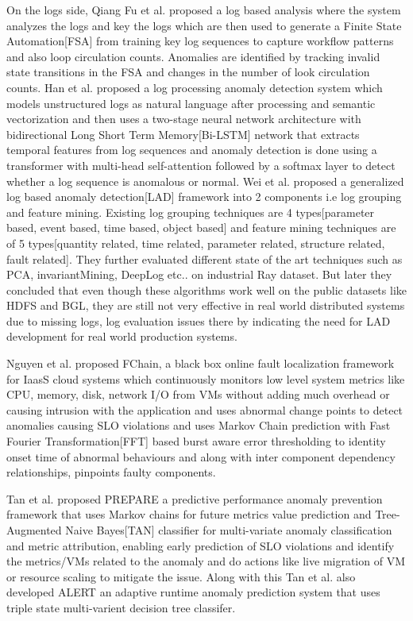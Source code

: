 \documentclass[sigconf]{acmart}
\begin{document}
On the logs side, Qiang Fu et al. proposed a log based analysis where the system analyzes the logs and key the logs which are then used to generate a Finite State Automation[FSA] from training key log sequences to capture workflow patterns and also loop circulation counts. Anomalies are identified by tracking invalid state transitions in the FSA and changes in the number of look circulation counts.\cite{5360240} Han et al. proposed a log processing anomaly detection system which models unstructured logs as natural language after processing and semantic vectorization and then uses a two-stage neural network architecture with bidirectional Long Short Term Memory[Bi-LSTM] network that extracts temporal features from log sequences and anomaly detection is done using a transformer with multi-head self-attention followed by a softmax layer to detect whether a log sequence is anomalous or normal.\cite{https://doi.org/10.1111/coin.12573} Wei et al. proposed a generalized log based anomaly detection[LAD] framework into 2 components i.e log grouping and feature mining. Existing log grouping techniques are 4 types[parameter based, event based, time based, object based] and feature mining techniques are of 5 types[quantity related, time related, parameter related, structure related, fault related]. They further evaluated different state of the art techniques such as PCA, invariantMining, DeepLog etc.. on industrial Ray dataset. But later they concluded that even though these algorithms work well on the public datasets like HDFS and BGL, they are still not very effective in real world distributed systems due to missing logs, log evaluation issues there by indicating the need for LAD development for real world production systems.\cite{https://doi.org/10.1002/smr.2650}

Nguyen et al. proposed FChain, a black box online fault localization framework for IaasS cloud systems which continuously monitors low level system metrics like CPU, memory, disk, network I/O from VMs without adding much overhead or causing intrusion with the application and uses abnormal change points to detect anomalies causing SLO violations and uses Markov Chain prediction with Fast Fourier Transformation[FFT] based burst aware error thresholding to identity onset time of abnormal behaviours and along with inter component dependency relationships, pinpoints faulty components.\cite{6681572}

Tan et al. proposed PREPARE a predictive performance anomaly prevention framework that uses Markov chains for future metrics value prediction and Tree-Augmented Naive Bayes[TAN] classifier for multi-variate anomaly classification and metric attribution, enabling early prediction of SLO violations and identify the metrics/VMs related to the anomaly and do actions like live migration of VM or resource scaling to mitigate the issue.\cite{6258001} Along with this Tan et al. also developed ALERT an adaptive runtime anomaly prediction system that uses triple state multi-varient decision tree classifer.\cite{10.1145/1835698.1835741} 
\end{document}
